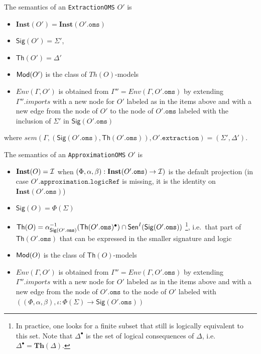 \documentclass[10pt,fleqn,final]{scrreprt}
\newcommand*{\syntax}[1]{\texttt{#1}}
\newcommand{\Sig}{\mathsf{Sig}}
\renewcommand{\Th}{\mathsf{Th}}
\newcommand{\Inst}{\ensuremath{\mathbf{Inst}}}
\newenvironment{definitions}[0]{\medskip }{}
\begin{document}
\begin{definitions}
The semantics of an \syntax{ExtractionOMS} $O'$ is
\begin{itemize}
  \item $\Inst(O') = \Inst(O'.\syntax{oms})$
  \item $\Sig(O') = \Sigma'$,
  \item $\Th(O') = \Delta'$
  \item $\mathsf{Mod}(O')$ is the class of $Th(O)$-models
  \item $Env(\Gamma, O')$ is obtained from 
       $\Gamma'' = Env(\Gamma, O'.\syntax{oms})$
       by extending $\Gamma''.imports$
        with a new node for $O'$ labeled as in the items above
        and with a new edge from the node of $O'$ to the node of 
        $O'.\syntax{oms}$ labeled with
        the inclusion of $\Sigma'$ in $\Sig(O'.\syntax{oms})$
\end{itemize}
where 
$sem(\Gamma, (\Sig(O'.\syntax{oms}), \Th(O'.\syntax{oms})), O'.\syntax{extraction}) = 
(\Sigma',\Delta')$.

The semantics of an \syntax{ApproximationOMS} $O'$ is
\begin{itemize}
  \item $\Inst(O) = \cI$ when $(\Phi,\alpha,\beta) : \Inst(O'.\syntax{oms}) \to \cI)$ is the default projection (in case $O'.\syntax{approximation}.\syntax{logicRef}$ is missing, it is the identity on $\Inst(O'.\syntax{oms})$)
  \item $\Sig(O) = \Phi(\Sigma)$
  \item $\Th(O) = \alpha^{-1}_{\Sig(O'.\syntax{oms})}(\Th(O'.\syntax{oms})^\bullet)\cap\Sen^I(\Sig(O'.\syntax{oms}))$%
\footnote{In  practice, one looks for a finite subset that still is logically equivalent to this set. Note that $\Delta^\bullet$ is the set of logical consequences of $\Delta$, i.e.\ $\Delta^\bullet = \mathbf{Th}(\Delta)$.}, i.e.\ that part of $\Th(O'.\syntax{oms})$ that can be expressed in the smaller signature and logic 
  \item $\mathsf{Mod}(O)$ is the class of $\Th(O)$-models
  \item $Env(\Gamma, O')$ is obtained from 
       $\Gamma'' = Env(\Gamma, O'.\syntax{oms})$
       by extending $\Gamma''.imports$
        with a new node for $O'$ labeled as in the items above
        and with a new edge from the node of $O'.\syntax{oms}$ to the node of $O'$ 
        labeled with $((\Phi,\alpha,\beta),\iota: \Phi(\Sigma) \to \Sig(O'.\syntax{oms}))$ 
\end{itemize}


\end{definitions}
\end{document}
